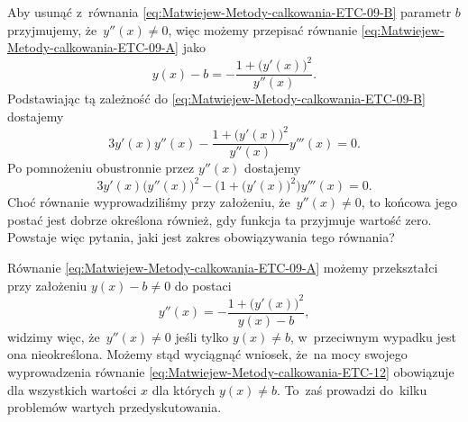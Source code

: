\documentclass[a4paper,11pt]{article}
\begin{document}
\noindent
Aby usunąć z~równania \eqref{eq:Matwiejew-Metody-calkowania-ETC-09-B}
parametr $b$ przyjmujemy, że~$y''( x ) \neq 0$, więc możemy przepisać równanie
\eqref{eq:Matwiejew-Metody-calkowania-ETC-09-A} jako
\begin{equation}
  \label{eq:Matwiejew-Metody-calkowania-ETC-10}
  y( x ) - b =
  -\frac{ 1 + \big( y'( x ) \big)^{ 2 } }{ y''( x ) }.
\end{equation}
Podstawiając tą zależność do \eqref{eq:Matwiejew-Metody-calkowania-ETC-09-B}
dostajemy
\begin{equation}
  \label{eq:Matwiejew-Metody-calkowania-ETC-11}
  3 y'( x ) y''( x ) -
  \frac{ 1 + \big( y'( x ) \big)^{ 2 } }{ y''( x ) } y'''( x ) = 0.
\end{equation}
Po pomnożeniu obustronnie przez $y''( x )$ dostajemy
\begin{equation}
  \label{eq:Matwiejew-Metody-calkowania-ETC-12}
  3 y'( x ) \big( y''( x ) \big)^{ 2 } -
  \Big( 1 + \big( y'( x ) \big)^{ 2 } \Big) y'''( x ) = 0.
\end{equation}
Choć równanie wyprowadziliśmy przy założeniu, że~$y''( x ) \neq 0$, to końcowa
jego postać jest dobrze określona również, gdy funkcja ta przyjmuje wartość
zero. Powstaje więc pytania, jaki jest zakres obowiązywania tego równania?

Równanie \eqref{eq:Matwiejew-Metody-calkowania-ETC-09-A} możemy przekształci
przy założeniu $y( x ) - b \neq 0$ do postaci
\begin{equation}
  \label{eq:Matwiejew-Metody-calkowania-ETC-13}
  y''( x ) =
  -\frac{ 1 + \big( y'( x ) \big)^{ 2 } }{ y( x ) - b },
\end{equation}
widzimy więc, że~$y''( x ) \neq 0$ jeśli tylko $y( x ) \neq b$, w~przeciwnym
wypadku jest ona nieokreślona. Możemy stąd wyciągnąć wniosek,
że~na mocy swojego wyprowadzenia równanie
\eqref{eq:Matwiejew-Metody-calkowania-ETC-12} obowiązuje dla wszystkich
wartości $x$ dla których $y( x ) \neq b$. To~zaś prowadzi do~kilku problemów
wartych przedyskutowania.
\end{document}
